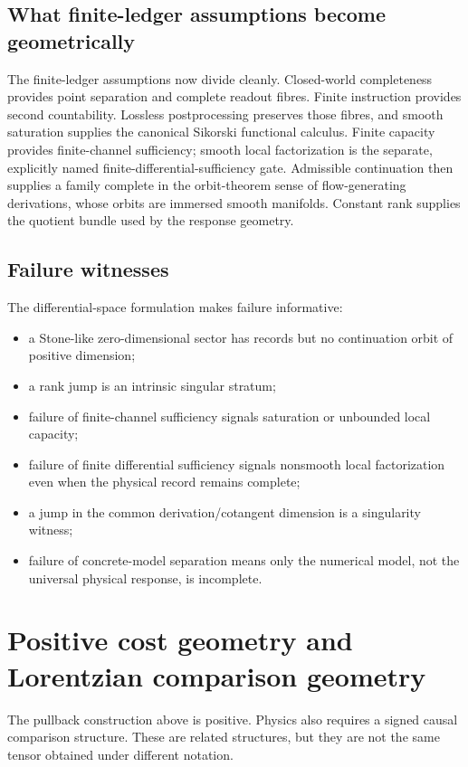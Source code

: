 \documentclass[11pt]{article}
\theoremstyle{remark}
\begin{document}
\subsection{What finite-ledger assumptions become geometrically}
The finite-ledger assumptions now divide cleanly.  Closed-world completeness
provides point separation and complete readout fibres.  Finite instruction
provides second countability.  Lossless postprocessing preserves those fibres,
and smooth saturation supplies the canonical Sikorski functional calculus.
Finite capacity provides finite-channel sufficiency; smooth local factorization
is the separate, explicitly named finite-differential-sufficiency gate.
Admissible continuation then supplies a family complete in the orbit-theorem sense of
flow-generating derivations, whose orbits are immersed smooth manifolds.
Constant rank supplies the quotient bundle used by the response geometry.

\subsection{Failure witnesses}
The differential-space formulation makes failure informative:
\begin{itemize}
\item a Stone-like zero-dimensional sector has records but no continuation
orbit of positive dimension;
\item a rank jump is an intrinsic singular stratum;
\item failure of finite-channel sufficiency signals saturation or unbounded
local capacity;
\item failure of finite differential sufficiency signals nonsmooth local
factorization even when the physical record remains complete;
\item a jump in the common derivation/cotangent dimension is a singularity
witness;
\item failure of concrete-model separation means only the numerical model, not
the universal physical response, is incomplete.
\end{itemize}

\section{Positive cost geometry and Lorentzian comparison geometry}
\label{sec:signature}

The pullback construction above is positive.  Physics also requires a signed causal comparison structure.  These are related structures, but they are not the same tensor obtained under different notation.
\end{document}
